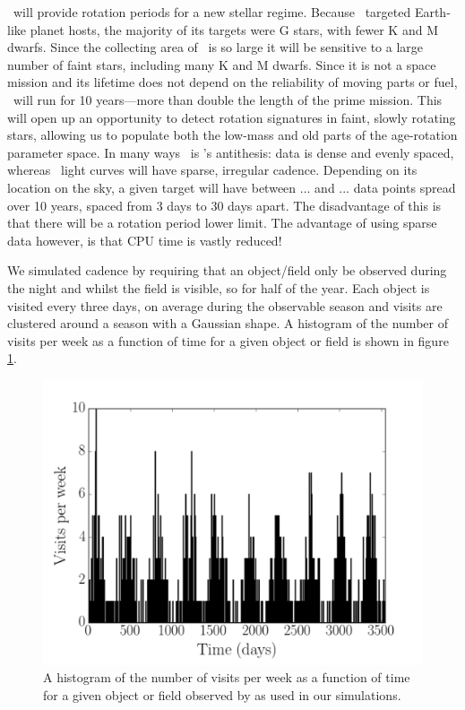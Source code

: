 \LSST\ will provide rotation periods for a new stellar regime.
Because \kepler\ targeted Earth-like planet hosts, the majority of its
targets were G stars, with fewer K and M dwarfs.
Since the collecting area of \LSST\ is so large it will be sensitive to a
large number of faint stars, including many K and M dwarfs.
Since it is not a space mission and its lifetime does not depend on the
reliability of moving parts or fuel, \LSST\ will run for 10 years---more than
double the length of the \kepler prime mission.
This will open up an opportunity to detect rotation signatures in faint,
slowly rotating stars, allowing us to populate both the low-mass and old parts
of the age-rotation parameter space.
In many ways \LSST\ is \kepler's antithesis: \kepler data is dense and evenly
spaced, whereas \LSST\ light curves will have sparse, irregular cadence.
Depending on its location on the sky, a given target will have between ... and
... data points spread over 10 years, spaced from 3 days to 30 days apart.
The disadvantage of this is that there will be a rotation period lower limit.
The advantage of using sparse data however, is that CPU time is vastly
reduced!

We simulated \LSST cadence by requiring that an object/field only be observed
during the night and whilst the field is visible, so for half of the year.
Each object is visited every three days, on average during the observable
season and visits are clustered around a season with a Gaussian shape.
A histogram of the number of visits per week as a function of time for a given
object or field is shown in figure \ref{fig:cadence_hist}.

\begin{figure}
\begin{center}
\includegraphics[width=6in, clip=true]{figures/cadence_hist}
\caption[An LSST cadence histogram.]
{A histogram of the number of visits per week as a function of time
for a given object or field observed by \LSST as used in our simulations.}
\label{fig:cadence_hist}
\end{center}
\end{figure}

